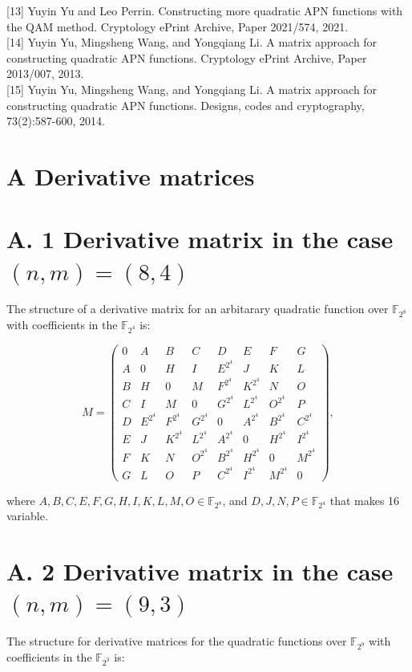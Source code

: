 \documentclass[10pt]{article}
\begin{document}
[13] Yuyin Yu and Leo Perrin. Constructing more quadratic APN functions with the QAM method. Cryptology ePrint Archive, Paper 2021/574, 2021.\\[0pt]
[14] Yuyin Yu, Mingsheng Wang, and Yongqiang Li. A matrix approach for constructing quadratic APN functions. Cryptology ePrint Archive, Paper 2013/007, 2013.\\[0pt]
[15] Yuyin Yu, Mingsheng Wang, and Yongqiang Li. A matrix approach for constructing quadratic APN functions. Designs, codes and cryptography, 73(2):587-600, 2014.

\section*{A Derivative matrices}
\section*{A. 1 Derivative matrix in the case $(n, m)=(8,4)$}
The structure of a derivative matrix for an arbitarary quadratic function over $\mathbb{F}_{2^{8}}$ with coefficients in the $\mathbb{F}_{2^{4}}$ is:

\[
M=\left(\begin{array}{cccccccc}
0 & A & B & C & D & E & F & G  \tag{20}\\
A & 0 & H & I & E^{2^{4}} & J & K & L \\
B & H & 0 & M & F^{2^{4}} & K^{2^{4}} & N & O \\
C & I & M & 0 & G^{2^{4}} & L^{2^{4}} & O^{2^{4}} & P \\
D & E^{2^{4}} & F^{2^{4}} & G^{2^{4}} & 0 & A^{2^{4}} & B^{2^{4}} & C^{2^{4}} \\
E & J & K^{2^{4}} & L^{2^{4}} & A^{2^{4}} & 0 & H^{2^{4}} & I^{2^{4}} \\
F & K & N & O^{2^{4}} & B^{2^{4}} & H^{2^{4}} & 0 & M^{2^{4}} \\
G & L & O & P & C^{2^{4}} & I^{2^{4}} & M^{2^{4}} & 0
\end{array}\right),
\]

where $A, B, C, E, F, G, H, I, K, L, M, O \in \mathbb{F}_{2^{8}}$, and $D, J, N, P \in \mathbb{F}_{2^{4}}$ that makes 16 variable.

\section*{A. 2 Derivative matrix in the case $(n, m)=(9,3)$}
The structure for derivative matrices for the quadratic functions over $\mathbb{F}_{2^{9}}$ with coefficients in the $\mathbb{F}_{2^{3}}$ is:
\end{document}
